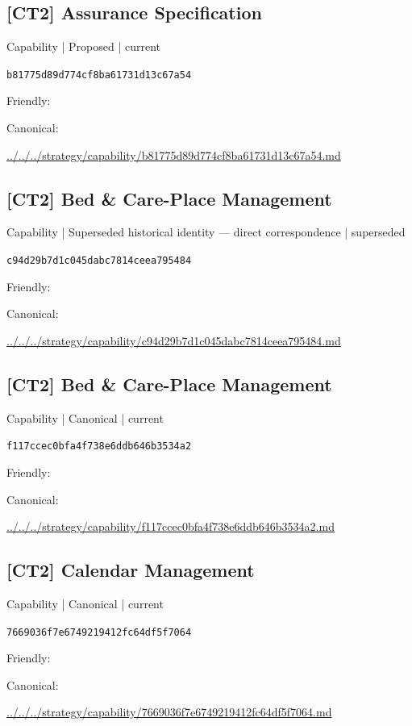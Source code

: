 \documentclass[10pt,a4paper]{article}
\begin{document}
\subsection*{[CT2] Assurance Specification}
{\small Capability | Proposed | current}\par
\texttt{b81775d89d774cf8ba61731d13c67a54}\par
Friendly: \par
Canonical: \par
{\footnotesize\url{../../../strategy/capability/b81775d89d774cf8ba61731d13c67a54.md}}\par
\subsection*{[CT2] Bed \& Care-Place Management}
{\small Capability | Superseded historical identity — direct correspondence | superseded}\par
\texttt{c94d29b7d1c045dabc7814ceea795484}\par
Friendly: \par
Canonical: \par
{\footnotesize\url{../../../strategy/capability/c94d29b7d1c045dabc7814ceea795484.md}}\par
\subsection*{[CT2] Bed \& Care-Place Management}
{\small Capability | Canonical | current}\par
\texttt{f117ccec0bfa4f738e6ddb646b3534a2}\par
Friendly: \par
Canonical: \par
{\footnotesize\url{../../../strategy/capability/f117ccec0bfa4f738e6ddb646b3534a2.md}}\par
\subsection*{[CT2] Calendar Management}
{\small Capability | Canonical | current}\par
\texttt{7669036f7e6749219412fc64df5f7064}\par
Friendly: \par
Canonical: \par
{\footnotesize\url{../../../strategy/capability/7669036f7e6749219412fc64df5f7064.md}}\par
\end{document}
